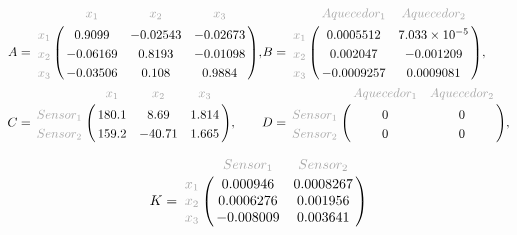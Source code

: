 \begin{equation*}
	\begin{aligned}
		A &= \bbordermatrix{
											&	\textcolor{matrixtitle}{x_1}	&	\textcolor{matrixtitle}{x_2}	&	\textcolor{matrixtitle}{x_3}	\cr
			\textcolor{matrixtitle}{x_1}	&	0.9099							&	-0.02543						&	-0.02673	 					\cr
			\textcolor{matrixtitle}{x_2}	&	-0.06169						&	0.8193							&	-0.01098	 					\cr
			\textcolor{matrixtitle}{x_3}	&	-0.03506						&	0.108							&	0.9884		 					\cr
		}
		, \\
		C &= \bbordermatrix{
												&	\textcolor{matrixtitle}{x_1}	&	\textcolor{matrixtitle}{x_2}	&	\textcolor{matrixtitle}{x_3}	\cr
			\textcolor{matrixtitle}{Sensor_1}	&	180.1							&	8.69							&	1.814							\cr
			\textcolor{matrixtitle}{Sensor_2}	&	159.2							&	-40.71							&	1.665							\cr
		}
		,
	\end{aligned}
	\begin{aligned}
		B &= \bbordermatrix{
											&	\textcolor{matrixtitle}{Aquecedor_1}	&	\textcolor{matrixtitle}{Aquecedor_2}	\cr
			\textcolor{matrixtitle}{x_1}	&	0.0005512								&	7.033 \times 10^{-5}					\cr
			\textcolor{matrixtitle}{x_2}	&	0.002047								&	-0.001209								\cr
			\textcolor{matrixtitle}{x_3}	&	-0.0009257								&	0.0009081								\cr
		}
		, \\
		D &= \bbordermatrix{
												&	\textcolor{matrixtitle}{Aquecedor_1}	&	\textcolor{matrixtitle}{Aquecedor_2}	\cr
			\textcolor{matrixtitle}{Sensor_1}	&	0           							&	0										\cr
			\textcolor{matrixtitle}{Sensor_2}	&	0           							&	0										\cr
		}
		,
	\end{aligned}
\end{equation*}

\begin{equation*}
	K = \bbordermatrix{
										&	\textcolor{matrixtitle}{Sensor_1}	&	\textcolor{matrixtitle}{Sensor_2}	\cr
		\textcolor{matrixtitle}{x_1}	&	0.000946							&	0.0008267							\cr
		\textcolor{matrixtitle}{x_2}	&	0.0006276							&	0.001956							\cr
		\textcolor{matrixtitle}{x_3}	&	-0.008009							&	0.003641							\cr
	}
\end{equation*}

